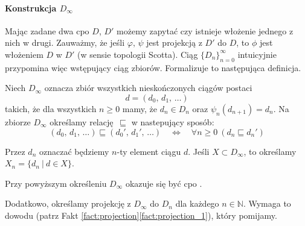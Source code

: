 \paragraph{Konstrukcja \(D_\infty\)}

Mając zadane dwa cpo \(D\), \(D'\) możemy zapytać czy istnieje włożenie jednego z nich w drugi. Zauważmy, że jeśli \(\varphi,\,\psi\) jest projekcją z \(D'\) do \(D\), to \(\phi\) jest włożeniem \(D\) w \(D'\) (w sensie topologii Scotta). Ciąg \(\{D_n\}_{n=0}^\infty\) intuicyjnie przypomina więc wstępujący ciąg zbiorów. Formalizuje to następująca definicja.


\begin{definicja}%
Niech \(D_\infty\) oznacza zbiór wszystkich nieskończonych ciągów postaci
\[
d=(d_0,\,d_1,\,\dots)
\]
takich, że dla wszystkich \(n\geq 0\) mamy, że \(d_n\in D_n\) oraz \(\psi_n (d_{n+1}) = d_n\). 
Na zbiorze \(D_\infty\) określamy relację \(\sqsubseteq\) w nastepujący sposób:
\[
(d_0,\,d_1,\,\dots) \sqsubseteq (d_0',\,d_1',\,\dots) \quad \Leftrightarrow\quad  \forall n\geq 0\  (d_n\sqsubseteq d_n') 
\]

  Przez \(d_n\) oznaczać będziemy \(n\)-ty element ciągu \(d\). Jeśli \(X\subset D_\infty\), to określamy \(X_n=\{ d_n\ |\ d\in X\}\).

\end{definicja}

Przy powyższym określeniu \(D_\infty\) okazuje się być cpo \cite[16.36]{Hindley:2008:LCI:1388400}.


Dodatkowo, określamy projekcję z \(D_\infty\) do \(D_n\) dla każdego \(n\in\mathbb{N}\).
Wymaga to dowodu (patrz Fakt \ref{fact:projection}\ref{fact:projection_1}), który pomijamy.

